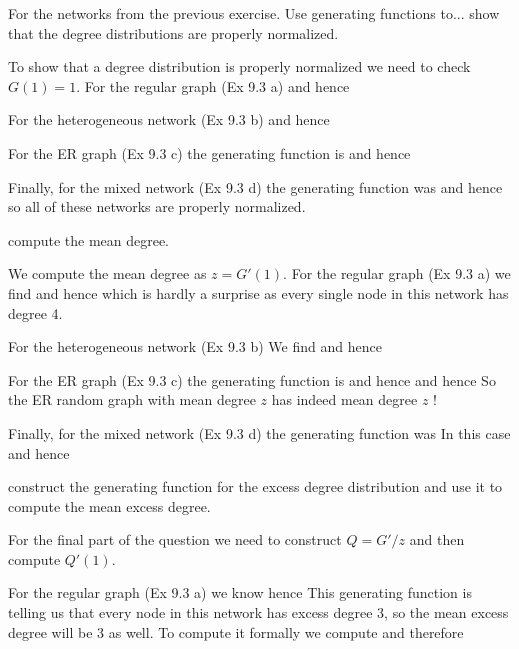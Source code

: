 For the networks from the previous exercise. Use generating functions to...
\subquestion show that the degree distributions are properly normalized.

\solution 
To show that a degree distribution is properly normalized we need to check $G(1)=1$. For the regular graph (Ex 9.3 a) 
and hence 

For the heterogeneous network (Ex 9.3 b) 
and hence 

For the ER graph (Ex 9.3 c) the generating function is 
and hence 

Finally, for the mixed network (Ex 9.3 d) the generating function was  
and hence 
so all of these networks are properly normalized. 

\subquestion compute the mean degree. 

\solution
We compute the mean degree as $z=G'(1)$. 
For the regular graph (Ex 9.3 a) 
we find 
and hence 
which is hardly a surprise as every single node in this network has degree 4.

For the heterogeneous network (Ex 9.3 b) 
We find 
and hence 

For the ER graph (Ex 9.3 c) the generating function is 
and hence 
and hence 
So the ER random graph with mean degree $z$ has indeed mean degree $z$ !

Finally, for the mixed network (Ex 9.3 d) the generating function was  
In this case 
and hence

\subquestion construct the generating function for the excess degree distribution and use it to compute the mean excess degree. 

\solution
For the final part of the question we need to construct $Q=G'/z$ and then compute $Q'(1)$.

For the regular graph (Ex 9.3 a) we know 
hence 
This generating function is telling us that every node in this network has excess degree 3, so the mean excess degree will be 3 as well. To compute it formally we compute 
and therefore

